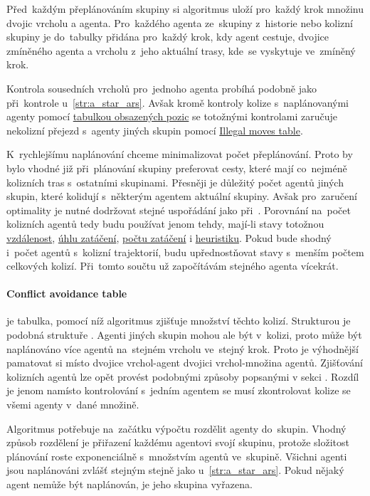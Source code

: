 Před~každým přeplánováním skupiny si algoritmus uloží pro~každý krok množinu dvojic vrcholu a agenta.
Pro~každého agenta ze~skupiny z~historie nebo kolizní skupiny je do~tabulky přidána pro~každý krok, kdy agent cestuje,
dvojice zmíněného agenta a vrcholu z~jeho aktuální trasy, kde~se vyskytuje ve~zmíněný krok.

Kontrola sousedních vrcholů pro~jednoho agenta probíhá podobně jako při~kontrole u~\ref{str:a_star_ars}.
Avšak kromě kontroly kolize s~naplánovanými agenty pomocí \hyperref[par:obsazene_pozice]{tabulkou obsazených pozic}
se totožnými kontrolami zaručuje nekolizní přejezd s~agenty jiných skupin pomocí
\hyperref[par:varsg_illegal_moves_table]{Illegal moves table}.

K~rychlejšímu naplánování chceme minimalizovat počet přeplánování.
Proto by bylo vhodné již při~plánování skupiny preferovat cesty,
které mají co~nejméně kolizních tras s~ostatními skupinami.
Přesněji je důležitý počet agentů jiných skupin, které kolidují s~některým agentem aktuální skupiny.
Avšak pro~zaručení optimality je nutné dodržovat stejné uspořádání jako při~.
Porovnání na~počet kolizních agentů tedy budu používat jenom tehdy, mají-li stavy totožnou
\hyperref[par:ars_vzdalenost]{vzdálenost}, \hyperref[par:ars_uhel_zataceni]{úhlu zatáčení},
\hyperref[par:ars_pocet_zataceni]{počtu zatáčení} i \hyperref[par:ars_heuristika]{heuristiku}.
Pokud bude shodný i~počet agentů s~kolizní trajektorií, budu upřednostňovat stavy s~menším počtem celkových kolizí.
Při~tomto součtu už započítávám stejného agenta vícekrát.

\paragraph{Conflict avoidance table}\label{par:varsg_conflict_avoidance_table} je tabulka, pomocí níž
algoritmus zjišťuje množství těchto kolizí.
Strukturou je podobná struktuře .
Agenti jiných skupin mohou ale být v~kolizi, proto může být naplánováno více agentů na~stejném vrcholu ve~stejný krok.
Proto je výhodnější pamatovat si místo dvojice vrchol-agent dvojici vrchol-množina agentů.
Zjišťování kolizních agentů lze opět provést podobnými způsoby popsanými v sekci .
Rozdíl je jenom namísto kontrolování s~jedním agentem
se musí zkontrolovat kolize se všemi agenty v~dané množině.

Algoritmus potřebuje na~začátku výpočtu rozdělit agenty do~skupin.
Vhodný způsob rozdělení je přiřazení každému agentovi svojí skupinu,
protože složitost plánování roste exponenciálně s~množstvím agentů ve~skupině.
Všichni agenti jsou naplánováni zvlášť stejným stejně jako u~\ref{str:a_star_ars}.
Pokud nějaký agent nemůže být naplánován, je jeho skupina vyřazena.

